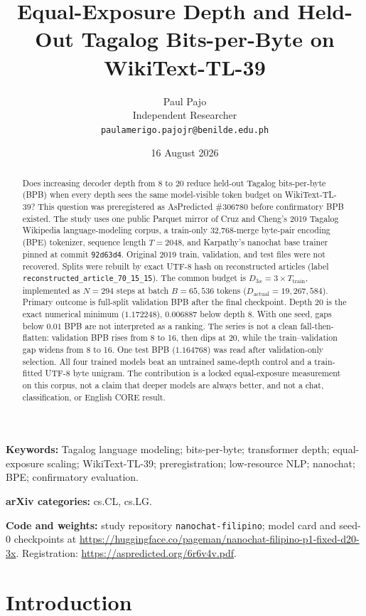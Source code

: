 \documentclass[11pt,a4paper]{article}
\title{Equal-Exposure Depth and Held-Out Tagalog Bits-per-Byte on WikiText-TL-39}
\author{Paul Pajo\\
Independent Researcher\\
\texttt{paulamerigo.pajojr@benilde.edu.ph}}
\date{16 August 2026}
\begin{document}
\maketitle

\begin{abstract}
Does increasing decoder depth from 8 to 20 reduce held-out Tagalog bits-per-byte (BPB) when every depth sees the same model-visible token budget on WikiText-TL-39? This question was preregistered as AsPredicted \#306780 before confirmatory BPB existed. The study uses one public Parquet mirror of Cruz and Cheng's 2019 Tagalog Wikipedia language-modeling corpus, a train-only 32{,}768-merge byte-pair encoding (BPE) tokenizer, sequence length $T=2048$, and Karpathy's nanochat base trainer pinned at commit \texttt{92d63d4}. Original 2019 train, validation, and test files were not recovered. Splits were rebuilt by exact UTF-8 hash on reconstructed articles (label \texttt{reconstructed\_article\_70\_15\_15}). The common budget is $D_{3x}=3\times T_{\mathrm{train}}$, implemented as $N=294$ steps at batch $B=65{,}536$ tokens ($D_{\mathrm{actual}}=19{,}267{,}584$). Primary outcome is full-split validation BPB after the final checkpoint. Depth 20 is the exact numerical minimum ($1.172248$), $0.006887$ below depth 8. With one seed, gaps below $0.01$ BPB are not interpreted as a ranking. The series is not a clean fall-then-flatten: validation BPB rises from 8 to 16, then dips at 20, while the train--validation gap widens from 8 to 16. One test BPB ($1.164768$) was read after validation-only selection. All four trained models beat an untrained same-depth control and a train-fitted UTF-8 byte unigram. The contribution is a locked equal-exposure measurement on this corpus, not a claim that deeper models are always better, and not a chat, classification, or English CORE result.
\end{abstract}

\noindent\textbf{Keywords:} Tagalog language modeling; bits-per-byte; transformer depth; equal-exposure scaling; WikiText-TL-39; preregistration; low-resource NLP; nanochat; BPE; confirmatory evaluation.

\noindent\textbf{arXiv categories:} cs.CL, cs.LG.

\noindent\textbf{Code and weights:} study repository \texttt{nanochat-filipino}; model card and seed-0 checkpoints at \url{https://huggingface.co/pageman/nanochat-filipino-p1-fixed-d20-3x}. Registration: \url{https://aspredicted.org/6r6v4v.pdf}.

\section{Introduction}
\label{sec:intro}
\end{document}
